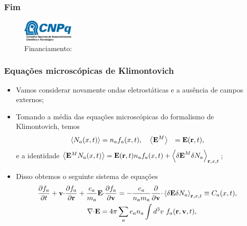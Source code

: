 \documentclass[10pt,aspectratio=1610,lualatex]{beamer}
\begin{document}
\begin{frame}
  \frametitle{Fim}
  \vspace{1.5cm}

  \vspace{1.5cm}

  \begin{figure}
    \caption*{Financiamento:}
    \centering
    \includegraphics[width=0.22\textwidth]{cnpq.png}
  \end{figure}
\end{frame}


\begin{frame}[noframenumbering]
  \frametitle{Equações microscópicas de Klimontovich}
  \begin{itemize}
\item Vamos considerar novamente ondas eletrostáticas e a ausência de campos
  externos;
\item Tomando a média das equações microscópicas do formalismo de Klimontovich,
  temos
  \begin{eqnarray}
  \left<N_a(x,t)\right>&=n_a f_a(x,t), \quad 
  \left<{\bf E}^M\right>&= {\bf E}({\bf r},t),
  \end{eqnarray}
  e a identidade $\left<{\bf E}^M N_a(x,t)\right> = {\bf E}({\bf r},t)n_af_a(x,t)
  + \left<{\delta \bf E}^M \delta N_a\right>_{{\bf r},x,t}$;
\item Disso obtemos o seguinte sistema de equações
  \begin{equation}
  \begin{split}
    \frac{\partial f_a}{\partial t}
    +{\bf v \cdot}\frac{\partial f_a}{\partial \bf r}
    +\frac{e_a}{m_a}{\bf E}{\bf \cdot}\frac{\partial f_a}{\partial \bf v}
    &=-\frac{e_a}{n_a m_a} \frac{\partial }{\partial \bf v}{\bf \cdot}
    \left<\delta{\bf E}\delta N_a\right>_{{\bf r},x,t}\equiv C_a(x,t),\\
    \nabla {\bf \cdot E}=4\pi& \sum_a e_a n_a \int d^3v\ f_a({\bf r,v},t),
  \end{split}
  \label{sist-av}
  \end{equation}
  \end{itemize}
\end{frame}
\end{document}
